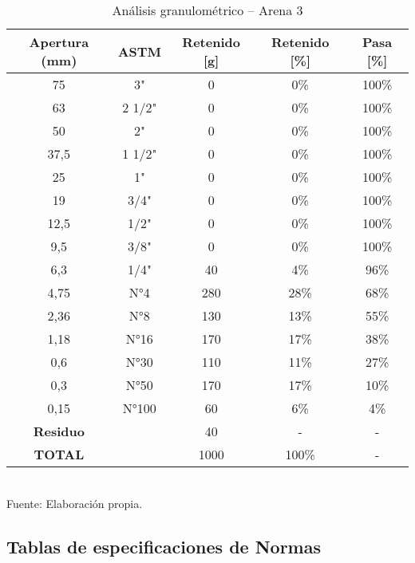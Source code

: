 \begin{table}[H]
\centering
\caption{Análisis granulométrico – Arena 3}
\label{tab:arena3}
\small
\begin{tabular}{|c|c|c|c|c|}
\hline
\textbf{Apertura (mm)} & \textbf{ASTM} & \textbf{Retenido [g]} & \textbf{Retenido [\%]} & \textbf{Pasa [\%]} \\ \hline
75   & 3"      & 0   & 0\%  & 100\% \\ \hline
63   & 2 1/2"  & 0   & 0\%  & 100\% \\ \hline
50   & 2"      & 0   & 0\%  & 100\% \\ \hline
37,5 & 1 1/2"  & 0   & 0\%  & 100\% \\ \hline
25   & 1"      & 0   & 0\%  & 100\% \\ \hline
19   & 3/4"    & 0   & 0\%  & 100\% \\ \hline
12,5 & 1/2"    & 0   & 0\%  & 100\% \\ \hline
9,5  & 3/8"    & 0   & 0\%  & 100\% \\ \hline
6,3  & 1/4"    & 40  & 4\%  & 96\%  \\ \hline
4,75 & N°4     & 280 & 28\% & 68\%  \\ \hline
2,36 & N°8     & 130 & 13\% & 55\%  \\ \hline
1,18 & N°16    & 170 & 17\% & 38\%  \\ \hline
0,6  & N°30    & 110 & 11\% & 27\%  \\ \hline
0,3  & N°50    & 170 & 17\% & 10\%  \\ \hline
0,15 & N°100   & 60  & 6\%  & 4\%   \\ \hline
\textbf{Residuo} &     & 40  & -    & -     \\ \hline
\textbf{TOTAL}  &     & 1000& 100\%& -     \\ \hline
\end{tabular}
\\ Fuente: Elaboración propia.
\end{table}

\subsection{Tablas de especificaciones de Normas}

